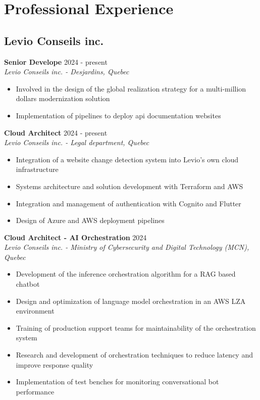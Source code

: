 ﻿\documentclass[11pt,letterpaper]{article}
\begin{document}
\section*{Professional Experience}

\subsection*{Levio Conseils inc.}

\textbf{Senior Develope} \hfill 2024 - present\\
\textit{Levio Conseils inc. - Desjardins, Quebec}
\begin{itemize}
\item Involved in the design of the global realization strategy for a multi-million dollars modernization solution
\item Implementation of pipelines to deploy api documentation websites
\end{itemize}

\textbf{Cloud Architect} \hfill 2024 - present\\
\textit{Levio Conseils inc. - Legal department, Quebec}
\begin{itemize}
\item Integration of a website change detection system into Levio's own cloud infrastructure
\item Systems architecture and solution development with Terraform and AWS
\item Integration and management of authentication with Cognito and Flutter
\item Design of Azure and AWS deployment pipelines
\end{itemize}

\textbf{Cloud Architect - AI Orchestration} \hfill 2024\\
\textit{Levio Conseils inc. - Ministry of Cybersecurity and Digital Technology (MCN), Quebec}
\begin{itemize}
\item Development of the inference orchestration algorithm for a RAG based chatbot
\item Design and optimization of language model orchestration in an AWS LZA environment
\item Training of production support teams for maintainability of the orchestration system
\item Research and development of orchestration techniques to reduce latency and improve response quality
\item Implementation of test benches for monitoring conversational bot performance
\end{itemize}
\end{document}
